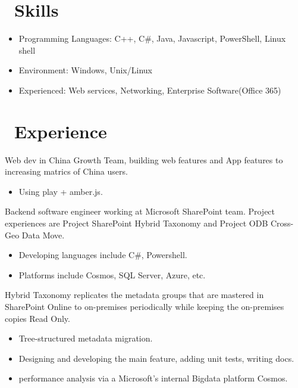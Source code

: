 \documentclass{resume}
\begin{document}



\section{\faCogs\ Skills}
\begin{itemize}[parsep=0.5ex]
  \item Programming Languages: C++, C\#, Java, Javascript, PowerShell, Linux shell
  \item Environment: Windows, Unix/Linux
  \item Experienced: Web services, Networking, Enterprise Software(Office 365)
\end{itemize}

\section{\faUsers\ Experience}
Web dev in China Growth Team, building web features and App features to increasing matrics of China users.
\begin{itemize}
\item Using play + amber.js.
\end{itemize}

Backend software engineer working at Microsoft SharePoint team. Project experiences are Project SharePoint Hybrid Taxonomy and Project ODB Cross-Geo Data Move.
\begin{itemize}
\item Developing languages include C\#, Powershell.
\item Platforms include Cosmos, SQL Server, Azure, etc.
\end{itemize}

Hybrid Taxonomy replicates the metadata groups that are mastered in SharePoint Online to on-premises periodically
while keeping the on-premises copies Read Only.
\begin{itemize}
  \item Tree-structured metadata migration.
  \item Designing and developing the main feature, adding unit tests, writing docs.
  \item performance analysis via a Microsoft's internal Bigdata platform Cosmos.
\end{itemize}
\end{document}
